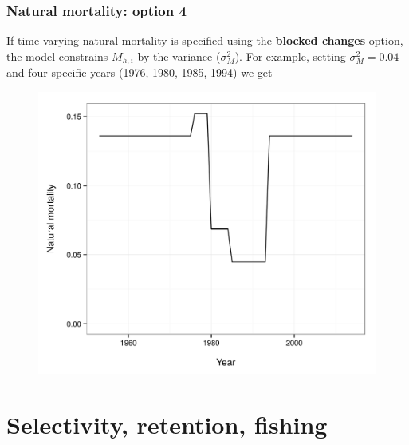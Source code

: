 \documentclass{beamer}
\begin{document}
\begin{frame}
\frametitle{Natural mortality: option 4}
If time-varying natural mortality is specified using the {\bf blocked changes}
option, the model constrains $M_{h,i}$ by the variance ($\sigma^2_M$). For
example, setting $\sigma^2_M = 0.04$ and four specific years (1976, 1980, 1985,
1994) we get
\begin{figure}[!htbp]
  \centering
  \includegraphics[width=0.65\linewidth]{figure/M_t_block.png}
\end{figure}
\end{frame}


\section{Selectivity, retention, fishing}

\end{document}
